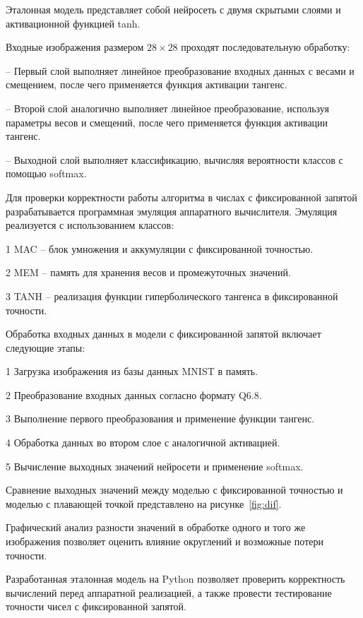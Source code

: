 Эталонная модель представляет собой нейросеть с двумя скрытыми слоями и 
активационной функцией {tanh}.  

Входные изображения размером \(28 \times 28\) проходят последовательную 
обработку:

  – Первый слой выполняет линейное преобразование входных данных с весами и 
смещением, после чего применяется функция активации тангенс.
    
  – Второй слой аналогично выполняет линейное преобразование, используя 
параметры весов и смещений, после чего применяется функция активации тангенс.
    
  – Выходной слой выполняет классификацию, вычисляя вероятности классов с 
помощью softmax.

Для проверки корректности работы алгоритма в числах с фиксированной запятой 
разрабатывается программная эмуляция аппаратного вычислителя. Эмуляция 
реализуется с использованием классов:

  1 {MAC} – блок умножения и аккумуляции с фиксированной точностью.
    
  2 {MEM} – память для хранения весов и промежуточных значений.
    
  3 {TANH} – реализация функции гиперболического тангенса в фиксированной 
точности.

Обработка входных данных в модели с фиксированной запятой включает следующие 
этапы:

  1 Загрузка изображения из базы данных MNIST в память.

  2 Преобразование входных данных согласно формату Q6.8.
    
  3 Выполнение первого преобразования и применение функции тангенс.

  4 Обработка данных во втором слое с аналогичной активацией.

  5 Вычисление выходных значений нейросети и применение softmax.

Сравнение выходных значений между моделью с фиксированной точностью и моделью с
плавающей точкой представлено на рисунке~\ref{fig:dif}.  


Графический анализ разности значений в обработке одного и того же изображения 
позволяет оценить влияние округлений и возможные потери точности.

Разработанная эталонная модель на Python позволяет проверить корректность 
вычислений перед аппаратной реализацией, а также провести тестирование 
точности чисел с фиксированной запятой.

